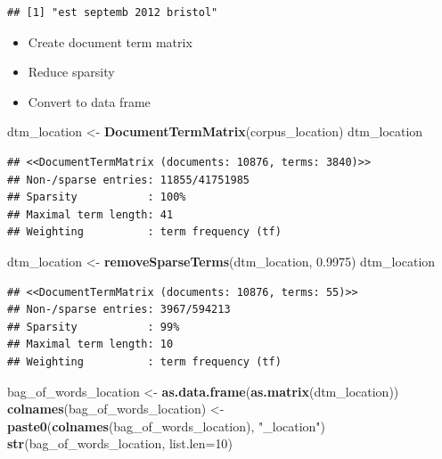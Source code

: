 \documentclass[
]{article}
\newenvironment{Shaded}{\begin{snugshade}}{\end{snugshade}}
\newcommand{\DataTypeTok}[1]{\textcolor[rgb]{0.13,0.29,0.53}{#1}}
\newcommand{\DecValTok}[1]{\textcolor[rgb]{0.00,0.00,0.81}{#1}}
\newcommand{\FloatTok}[1]{\textcolor[rgb]{0.00,0.00,0.81}{#1}}
\newcommand{\KeywordTok}[1]{\textcolor[rgb]{0.13,0.29,0.53}{\textbf{#1}}}
\newcommand{\NormalTok}[1]{#1}
\newcommand{\OperatorTok}[1]{\textcolor[rgb]{0.81,0.36,0.00}{\textbf{#1}}}
\newcommand{\StringTok}[1]{\textcolor[rgb]{0.31,0.60,0.02}{#1}}
\providecommand{\tightlist}{%
  \setlength{\itemsep}{0pt}\setlength{\parskip}{0pt}}
\begin{document}
\begin{Shaded}
\end{Shaded}

\begin{verbatim}
## [1] "est septemb 2012 bristol"
\end{verbatim}

\begin{itemize}
\tightlist
\item
  Create document term matrix
\item
  Reduce sparsity
\item
  Convert to data frame
\end{itemize}

\begin{Shaded}
\begin{Highlighting}[]
\NormalTok{dtm_location <-}\StringTok{ }\KeywordTok{DocumentTermMatrix}\NormalTok{(corpus_location)}
\NormalTok{dtm_location}
\end{Highlighting}
\end{Shaded}

\begin{verbatim}
## <<DocumentTermMatrix (documents: 10876, terms: 3840)>>
## Non-/sparse entries: 11855/41751985
## Sparsity           : 100%
## Maximal term length: 41
## Weighting          : term frequency (tf)
\end{verbatim}

\begin{Shaded}
\begin{Highlighting}[]
\NormalTok{dtm_location <-}\StringTok{ }\KeywordTok{removeSparseTerms}\NormalTok{(dtm_location, }\FloatTok{0.9975}\NormalTok{)}
\NormalTok{dtm_location}
\end{Highlighting}
\end{Shaded}

\begin{verbatim}
## <<DocumentTermMatrix (documents: 10876, terms: 55)>>
## Non-/sparse entries: 3967/594213
## Sparsity           : 99%
## Maximal term length: 10
## Weighting          : term frequency (tf)
\end{verbatim}

\begin{Shaded}
\begin{Highlighting}[]
\NormalTok{bag_of_words_location <-}\StringTok{ }\KeywordTok{as.data.frame}\NormalTok{(}\KeywordTok{as.matrix}\NormalTok{(dtm_location))}
\KeywordTok{colnames}\NormalTok{(bag_of_words_location) <-}\StringTok{ }\KeywordTok{paste0}\NormalTok{(}\KeywordTok{colnames}\NormalTok{(bag_of_words_location), }\StringTok{"_location"}\NormalTok{)}
\KeywordTok{str}\NormalTok{(bag_of_words_location, }\DataTypeTok{list.len=}\DecValTok{10}\NormalTok{)}
\end{Highlighting}
\end{Shaded}
\end{document}
